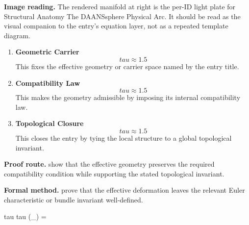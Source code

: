 \begin{samepage}
\noindent\begin{minipage}[t]{0.45\linewidth}
\vspace{0pt}
\raggedright
\scriptsize\textbf{Image reading.} The rendered manifold at right is the per-ID light plate for Structural Anatomy The DAANSsphere Physical Arc. It should be read as the visual companion to the entry's equation layer, not as a repeated template diagram.\par
\end{minipage}\hfill
\begin{minipage}[t]{0.53\linewidth}
\vspace*{-0.10in}
\raggedright
{}
\end{minipage}
\end{samepage}

\clearpage


\begin{enumerate}[leftmargin=1.6em,itemsep=9pt,topsep=6pt]
\item \textbf{Geometric Carrier}
\[
tau \approx 1.5
\]
This fixes the effective geometry or carrier space named by the entry title.

\item \textbf{Compatibility Law}
\[
tau \approx 1.5
\]
This makes the geometry admissible by imposing its internal compatibility law.

\item \textbf{Topological Closure}
\[
tau \approx 1.5
\]
This closes the entry by tying the local structure to a global topological invariant.
\end{enumerate}

\textbf{Proof route.} show that the effective geometry preserves the required compatibility condition while supporting the stated topological invariant.

\textbf{Formal method.} prove that the effective deformation leaves the relevant Euler characteristic or bundle invariant well-defined.

\medskip
{}

\begin{tzpsnapshot}
\end{tzpsnapshot}

\tzpequationlinks
  {tau }
  {tau }
  {\chi(_{}) = \cdots}
